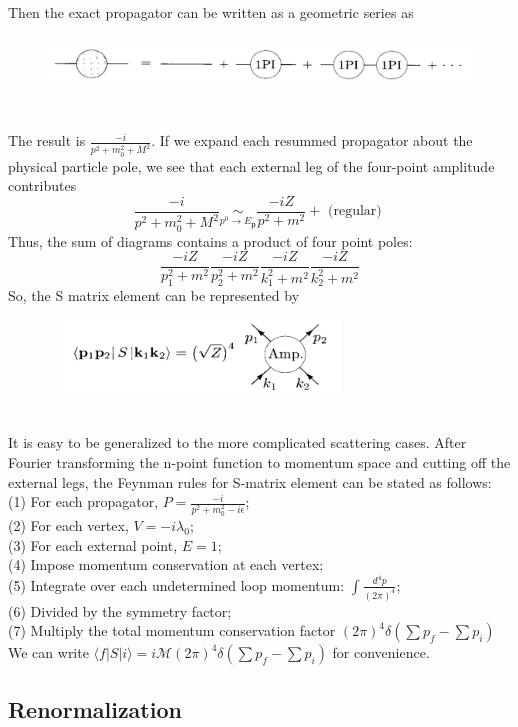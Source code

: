 \documentclass{article}
\begin{document}
Then the exact propagator can be written as a geometric series as
\begin{figure}[!h]
\centering
\includegraphics[height=1.5cm ,width=15cm]{./pic/LSZ3.png}
\caption*{}
\end{figure}\\
The result is $\frac{-i}{p^2 + m_0^2 + M^2}$. If we expand each resummed propagator about the physical particle pole, we see that each external leg of the four-point amplitude contributes
\[\frac{-i}{p^2 + m_0^2 + M^2} \underset{p^0 \to E_{\mathbf{p}}}{\sim} \frac{-iZ}{p^2+m^2} + \mbox{ (regular) }\]
Thus, the sum of diagrams contains a product of four point poles:
\[\frac{-iZ}{p_1^2 + m^2} \frac{-iZ}{p_2^2 + m^2} \frac{-iZ}{k_1^2 + m^2} \frac{-iZ}{k_2^2 + m^2}\]
So, the S matrix element can be represented by 
\begin{figure}[!h]
\centering
\includegraphics[height=2cm ,width=8cm]{./pic/LSZ4.png}
\caption*{}
\end{figure}\\
It is easy to be generalized to the more complicated scattering cases. After Fourier transforming the n-point function to momentum space and cutting off the external legs, the Feynman rules for S-matrix element can be stated as follows:\\
(1) For each propagator, $P = \frac{-i}{p^2 + m_0^2 -i\epsilon}$;\\
(2) For each vertex, $V = -i\lambda_0$;\\
(3) For each external point, $E=1$;\\
(4) Impose momentum conservation at each vertex;\\
(5) Integrate over each undetermined loop momentum: $\int \frac{d^4p}{(2\pi)^4}$;\\
(6) Divided by the symmetry factor;\\
(7) Multiply the total momentum conservation factor $(2\pi)^4 \delta(\sum p_f - \sum p_i)$ 
We can write $\langle f | S | i \rangle = i \mathcal{M} (2\pi)^4 \delta(\sum p_f - \sum p_i)$ for convenience.

\subsection{Renormalization}
\end{document}
